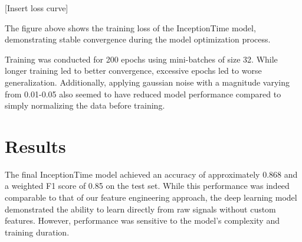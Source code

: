 [Insert loss curve]

The figure above shows the training loss of the InceptionTime model, demonstrating stable convergence during the model optimization process. 

Training was conducted for 200 epochs using mini-batches of size 32. While longer training led to better convergence, excessive epochs led to worse generalization. Additionally, applying gaussian noise with a magnitude varying from 0.01-0.05 also seemed to have reduced model performance compared to simply normalizing the data before training.

\section{Results}
The final InceptionTime model achieved an accuracy of approximately 0.868 and a weighted F1 score of 0.85 on the test set. While this performance was indeed comparable to that of our feature engineering approach, the deep learning model demonstrated the ability to learn directly from raw signals without custom features. However, performance was sensitive to the model's complexity and training duration. 
